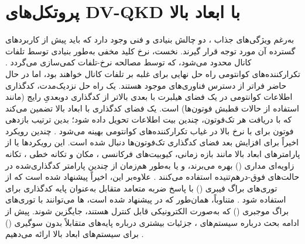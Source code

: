 \section{پروتکل‌های DV-QKD با ابعاد بالا}
\label{sec:8-4}
به‌رغم ویژگی‌های جذاب ، دو چالش بنیادی و فنی وجود دارد که باید پیش از کاربردهای گسترده آن مورد توجه قرار گیرند. نخست، نرخ کلید مخفی  به‌طور بنیادی توسط تلفات کانال محدود می‌شود، که توسط مصالحه نرخ-تلفات کمی‌سازی می‌گردد \cite{8-56, 8-57, 8-58}. تکرارکننده‌های کوانتومی راه حل نهایی برای غلبه بر تلفات کانال خواهند بود، اما در حال حاضر فراتر از دسترس فناوری‌های موجود هستند. یک راه حل نزدیک‌مدت، کدگذاری اطلاعات کوانتومی در یک فضای هیلبرت با بعدی بالاتر از کدگذاری دو‌بعدیِ رایج (مانند استفاده از حالات قطبش فوتون‌ها) است. یک فضای کدگذاری با ابعاد بالا تضمین می‌کند که با دریافت هر تک‌فوتون، چندین بیت اطلاعات تحویل داده شود؛ بدین ترتیب بازدهی فوتون برای  با نرخ بالا در غیاب تکرارکننده‌های کوانتومی بهینه می‌شود \cite{8-59}. چندین رویکرد اخیراً برای افزایش بعد فضای کدگذاری تک‌فوتون‌ها دنبال شده است. این رویکردها یا از پارامترهای ابعاد بالا مانند بازه زمانی، کیوبیت‌های فرکانسی \cite{8-60, 8-61}، مکان و تکانه خطی \cite{8-62, 8-63, 8-64}، تکانه زاویه‌ای مداری () \cite{8-32, 8-33, 8-65, 8-66, 8-67, 8-68, 8-69, 8-70, 8-71, 8-72} بهره می‌برند، و یا به‌طور هم‌زمان از چندین پارامتر کدگذاری‌شده در حالت‌های فوق-درهم‌تنیده استفاده می‌کنند \cite{8-73, 8-74}. علاوه‌بر این، اخیراً پیشنهاد شده است که از توری‌های براگ فیبری () با پاسخ ضربه متعامد متقابل به‌عنوان پایه کدگذاری برای  استفاده شود \cite{8-31}. متناوباً، همان‌طور که در \cite{8-75} پیشنهاد شده است، ها می‌توانند با توری‌های براگ موجبری () که به‌صورت الکترونیکی قابل کنترل هستند، جایگزین شوند. پیش از ادامه بحث درباره سیستم‌های ، جزئیات بیشتری درباره پایه‌های متقابلاً بدون سوگیری () برای سیستم‌های ابعاد بالا ارائه می‌دهیم \cite{8-31, 8-76, 8-77, 8-78, 8-79}.







